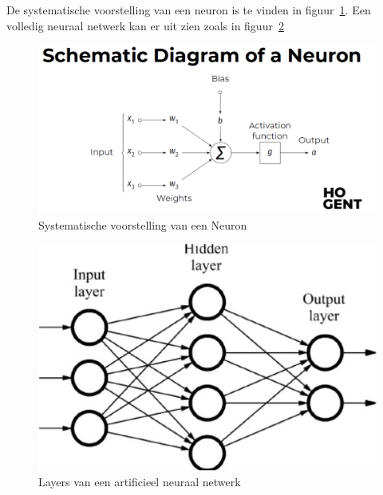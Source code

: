 De systematische voorstelling van een neuron is te vinden in figuur~\ref{fig:neuron}.
Een volledig neuraal netwerk kan er uit zien zoals in figuur~\ref{fig:layers}

\begin{figure}
    \centering
    \includegraphics[width=1\textwidth]{./img/neuron.png}
    \caption{\label{fig:neuron} Systematische voorstelling van een Neuron~\autocite{Lievens2021}}
\end{figure}

\begin{figure}
    \centering
    \includegraphics[width=1\textwidth]{./img/layers.jpg}
    \caption{\label{fig:layers} Layers van een artificieel neuraal netwerk~\autocite{Lievens2021}}
\end{figure}

